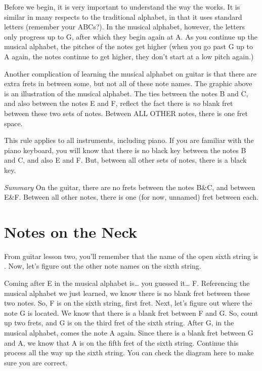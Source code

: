 Before we begin, it is very important to understand the way the  works. It is similar in many respects to the traditional alphabet, in
that it uses standard letters (remember your ABCs?). In the musical alphabet,
however, the letters only progress up to G, after which they begin again at A.
As you continue up the musical alphabet, the pitches of the notes get higher
(when you go past G up to A again, the notes continue to get higher, they don't
start at a low pitch again.)

Another complication of learning the musical alphabet on guitar is that there
are extra frets in between some, but not all of these note names. The graphic
above is an illustration of the musical alphabet. The ties between the notes B
and C, and also between the notes E and F, reflect the fact there is \emph{no} blank
fret between these two sets of notes. Between ALL OTHER notes, there is one
fret space.

This rule applies to all instruments, including piano. If you are familiar with
the piano keyboard, you will know that there is no black key between the notes
B and C, and also E and F. But, between all other sets of notes, there is a
black key.

\emph{Summary} On the guitar, there are no frets between the notes B\&C, and between
E\&F. Between all other notes, there is one (for now, unnamed) fret between
each.

\section{Notes on the Neck}
From guitar lesson two, you'll remember that the name of the open sixth string
is . Now, let's figure out the other note names on the sixth string.

Coming after E in the musical alphabet is\ldots{} you guessed it\ldots{} F. Referencing
the musical alphabet we just learned, we know there is no blank fret between
these two notes. So, F is on the sixth string, first fret. Next, let's figure
out where the note G is located. We know that there is a blank fret between F
and G. So, count up two frets, and G is on the third fret of the sixth string.
After G, in the musical alphabet, comes the note A again. Since there is a
blank fret between G and A, we know that A is on the fifth fret of the sixth
string. Continue this process all the way up the sixth string. You can check
the diagram here to make sure you are correct.

